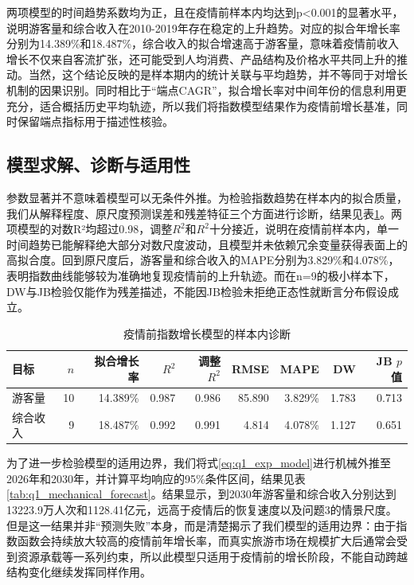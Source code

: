 \documentclass[withoutpreface,bwprint]{cumcmthesis}
\begin{document}
两项模型的时间趋势系数均为正，且在疫情前样本内均达到p<0.001的显著水平，说明游客量和综合收入在2010-2019年存在稳定的上升趋势。对应的拟合年增长率分别为14.389\%和18.487\%，综合收入的拟合增速高于游客量，意味着疫情前收入增长不仅来自客流扩张，还可能受到人均消费、产品结构及价格水平共同上升的推动。当然，这个结论反映的是样本期内的统计关联与平均趋势，并不等同于对增长机制的因果识别。同时相比于“端点CAGR”，拟合增长率对中间年份的信息利用更充分，适合概括历史平均轨迹，所以我们将指数模型结果作为疫情前增长基准，同时保留端点指标用于描述性核验。

\subsection{模型求解、诊断与适用性}

参数显著并不意味着模型可以无条件外推。为检验指数趋势在样本内的拟合质量，我们从解释程度、原尺度预测误差和残差特征三个方面进行诊断，结果见表\ref{tab:q1_diagnostics}。两项模型的对数R²均超过0.98，调整$R^2$和$R^2$十分接近，说明在疫情前样本内，单一时间趋势已能解释绝大部分对数尺度波动，且模型并未依赖冗余变量获得表面上的高拟合度。回到原尺度后，游客量和综合收入的MAPE分别为3.829\%和4.078\%，表明指数曲线能够较为准确地复现疫情前的上升轨迹。而在n=9的极小样本下，DW与JB检验仅能作为残差描述，不能因JB检验未拒绝正态性就断言分布假设成立。

\begin{table}[H]
\centering
\caption{疫情前指数增长模型的样本内诊断}
\label{tab:q1_diagnostics}
\small
\renewcommand{\arraystretch}{1.08}
\begin{tabular}{lrrrrrrrr}
\toprule
目标 & $n$ & 拟合增长率 & $R^2$ & 调整$R^2$ & RMSE & MAPE & DW & JB $p$值 \\
\midrule
游客量 & 10 & 14.389\% & 0.987 & 0.986 & 85.890 & 3.829\% & 1.783 & 0.713 \\
综合收入 & 9 & 18.487\% & 0.992 & 0.991 & 4.814 & 4.078\% & 1.127 & 0.651 \\
\bottomrule
\end{tabular}
\end{table}

为了进一步检验模型的适用边界，我们将式\eqref{eq:q1_exp_model}进行机械外推至2026年和2030年，并计算平均响应的95\%条件区间，结果见表\ref{tab:q1_mechanical_forecast}。结果显示，到2030年游客量和综合收入分别达到13223.9万人次和1128.41亿元，远高于疫情后的恢复速度以及问题3的情景尺度。但是这一结果并非“预测失败”本身，而是清楚揭示了我们模型的适用边界：由于指数函数会持续放大较高的疫情前年增长率，而真实旅游市场在规模扩大后通常会受到资源承载等一系列约束，所以此模型只适用于疫情前的增长阶段，不能自动跨越结构变化继续发挥同样作用。
\end{document}
